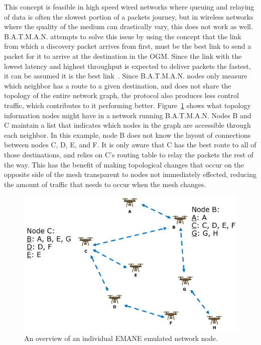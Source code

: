 This concept is feasible in high speed wired networks where queuing and relaying of data is often the slowest portion of a packets journey, but in wireless networks where the quality of the medium can drastically vary, this does not work as well.
B.A.T.M.A.N. attempts to solve this issue by using the concept that the link from which a discovery packet arrives from first, must be the best link to send a packet for it to arrive at the destination in the OGM.
Since the link with the lowest latency and highest throughput is expected to deliver packets the fastest, it can be assumed it is the best link~\cite{batman}.
Since B.A.T.M.A.N. nodes only measure which neighbor has a route to a given destination, and does not share the topology of the entire network graph, the protocol also produces less control traffic, which contributes to it performing better.
Figure~\ref{batman_topology} shows what topology information nodes might have in a network running B.A.T.M.A.N.
Nodes B and C maintain a list that indicates which nodes in the graph are accessible through each neighbor. In this example, node B does not know the layout of connections between nodes C, D, E, and F.
It is only aware that C has the best route to all of those destinations, and relies on C's routing table to relay the packets the rest of the way.
This has the benefit of making topological changes that occur on the opposite side of the mesh transparent to nodes not immediately effected, reducing the amount of traffic that needs to occur when the mesh changes.

\begin{figure}[!ht]
    \centering
    \includegraphics[width=\textwidth,keepaspectratio]{Images/Chpt2/BATMAN_topology.png}
    \caption{An overview of an individual EMANE emulated network node.}
    \label{batman_topology}
\end{figure}


